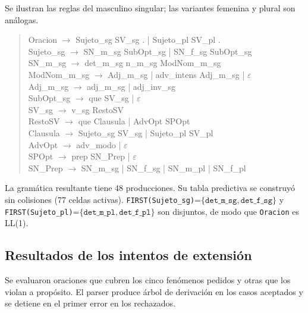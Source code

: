 Se ilustran las reglas del masculino singular; las variantes femenina y plural son análogas.

\begin{quote}
\small\ttfamily
Oracion $\rightarrow$ Sujeto\_sg SV\_sg . | Sujeto\_pl SV\_pl .\\
Sujeto\_sg $\rightarrow$ SN\_m\_sg SubOpt\_sg | SN\_f\_sg SubOpt\_sg\\
SN\_m\_sg $\rightarrow$ det\_m\_sg n\_m\_sg ModNom\_m\_sg\\
ModNom\_m\_sg $\rightarrow$ Adj\_m\_sg | adv\_intens Adj\_m\_sg | $\varepsilon$\\
Adj\_m\_sg $\rightarrow$ adj\_m\_sg | adj\_inv\_sg\\
SubOpt\_sg $\rightarrow$ que SV\_sg | $\varepsilon$\\
SV\_sg $\rightarrow$ v\_sg RestoSV\\
RestoSV $\rightarrow$ que Clausula | AdvOpt SPOpt\\
Clausula $\rightarrow$ Sujeto\_sg SV\_sg | Sujeto\_pl SV\_pl\\
AdvOpt $\rightarrow$ adv\_modo | $\varepsilon$\\
SPOpt $\rightarrow$ prep SN\_Prep | $\varepsilon$\\
SN\_Prep $\rightarrow$ SN\_m\_sg | SN\_f\_sg | SN\_m\_pl | SN\_f\_pl
\end{quote}

La gramática resultante tiene 48 producciones. Su tabla predictiva se construyó sin colisiones (77 celdas activas). \texttt{FIRST(Sujeto\_sg)}=$\{\texttt{det\_m\_sg},\texttt{det\_f\_sg}\}$ y \texttt{FIRST(Sujeto\_pl)}=$\{\texttt{det\_m\_pl},\texttt{det\_f\_pl}\}$ son disjuntos, de modo que \texttt{Oracion} es LL(1).

\subsection{Resultados de los intentos de extensión}
Se evaluaron oraciones que cubren los cinco fenómenos pedidos y otras que los violan a propósito. El parser produce árbol de derivación en los casos aceptados y se detiene en el primer error en los rechazados.

